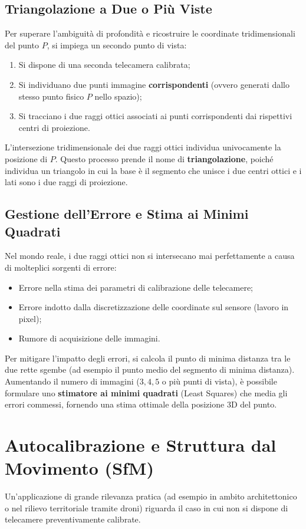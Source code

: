 \subsection{Triangolazione a Due o Più Viste}
Per superare l'ambiguità di profondità e ricostruire le coordinate tridimensionali del punto $P$, si impiega un secondo punto di vista:
\begin{enumerate}
    \item Si dispone di una seconda telecamera calibrata;
    \item Si individuano due punti immagine \textbf{corrispondenti} (ovvero generati dallo stesso punto fisico $P$ nello spazio);
    \item Si tracciano i due raggi ottici associati ai punti corrispondenti dai rispettivi centri di proiezione.
\end{enumerate}

L'intersezione tridimensionale dei due raggi ottici individua univocamente la posizione di $P$. Questo processo prende il nome di \textbf{triangolazione}, poiché individua un triangolo in cui la base è il segmento che unisce i due centri ottici e i lati sono i due raggi di proiezione.

\subsection{Gestione dell'Errore e Stima ai Minimi Quadrati}
Nel mondo reale, i due raggi ottici non si intersecano mai perfettamente a causa di molteplici sorgenti di errore:
\begin{itemize}
    \item Errore nella stima dei parametri di calibrazione delle telecamere;
    \item Errore indotto dalla discretizzazione delle coordinate sul sensore (lavoro in pixel);
    \item Rumore di acquisizione delle immagini.
\end{itemize}

Per mitigare l'impatto degli errori, si calcola il punto di minima distanza tra le due rette sgembe (ad esempio il punto medio del segmento di minima distanza). Aumentando il numero di immagini ($3, 4, 5$ o più punti di vista), è possibile formulare uno \textbf{stimatore ai minimi quadrati} (Least Squares) che media gli errori commessi, fornendo una stima ottimale della posizione 3D del punto.

\section{Autocalibrazione e Struttura dal Movimento (SfM)}
Un'applicazione di grande rilevanza pratica (ad esempio in ambito architettonico o nel rilievo territoriale tramite droni) riguarda il caso in cui non si dispone di telecamere preventivamente calibrate. 

